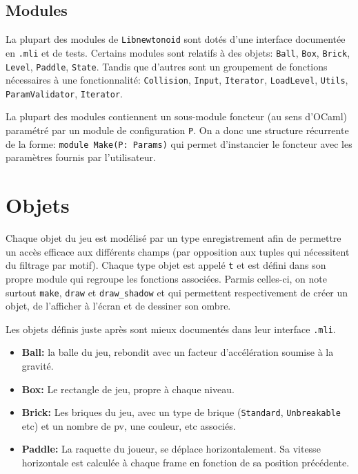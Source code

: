 \documentclass[french]{template}
\begin{document}
\subsection{Modules}

La plupart des modules de \texttt{Libnewtonoid} sont dotés d'une interface documentée en \texttt{.mli} et de tests. Certains modules sont relatifs à des objets: \texttt{Ball}, \texttt{Box}, \texttt{Brick}, \texttt{Level}, \texttt{Paddle}, \texttt{State}. Tandis que d'autres sont un groupement de fonctions nécessaires à une fonctionnalité: \texttt{Collision}, \texttt{Input}, \texttt{Iterator}, \texttt{LoadLevel}, \texttt{Utils}, \texttt{ParamValidator}, \texttt{Iterator}.

La plupart des modules contiennent un sous-module foncteur (au sens d'OCaml) paramétré par un module de configuration \texttt{P}. On a donc une structure récurrente de la forme: \texttt{module Make(P: Params)} qui permet d'instancier le foncteur avec les paramètres fournis par l'utilisateur.

\section{Objets}

Chaque objet du jeu est modélisé par un type enregistrement afin de permettre un accès efficace aux différents champs (par opposition aux tuples qui nécessitent du filtrage par motif). Chaque type objet est appelé \texttt{t} et est défini dans son propre module qui regroupe les fonctions associées. Parmis celles-ci, on note surtout \texttt{make}, \texttt{draw} et \texttt{draw\_shadow} et qui permettent respectivement de créer un objet, de l'afficher à l'écran et de dessiner son ombre.

Les objets définis juste après sont mieux documentés dans leur interface \texttt{.mli}.
\begin{itemize}
    \item \textbf{Ball:} la balle du jeu, rebondit avec un facteur d'accélération soumise à la gravité.
    \item \textbf{Box:} Le rectangle de jeu, propre à chaque niveau.
    \item \textbf{Brick:} Les briques du jeu, avec un type de brique (\texttt{Standard}, \texttt{Unbreakable} etc) et un nombre de pv, une couleur, etc associés.
    \item \textbf{Paddle:} La raquette du joueur, se déplace horizontalement. Sa vitesse horizontale est calculée à chaque frame en fonction de sa position précédente.
\end{itemize}
\end{document}
